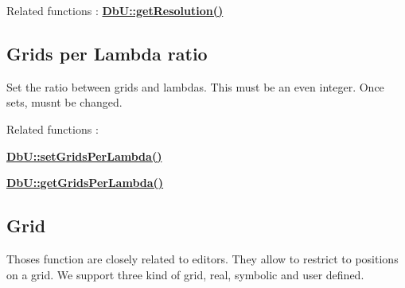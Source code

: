 Related functions \+: {\bfseries \mbox{\hyperlink{group__DbUGroup_ga120a60b09b344d01c583567a1e489d9e}{Db\+U\+::get\+Resolution()}}}\hypertarget{group__DbUGroup_secDbUGridsPerLamba}{}\subsection{Grids per Lambda ratio}\label{group__DbUGroup_secDbUGridsPerLamba}
Set the ratio between grids and lambdas. This must be an even integer. Once sets, musn\textquotesingle{}t be changed.

Related functions \+: 
\begin{DoxyItemize}
\item {\bfseries \mbox{\hyperlink{group__DbUGroup_gac93f9ba2a09105227e34bd05bcb1500c}{Db\+U\+::set\+Grids\+Per\+Lambda()}}} 
\item {\bfseries \mbox{\hyperlink{group__DbUGroup_ga9a0359adbfafc356326f5c6adf57ff04}{Db\+U\+::get\+Grids\+Per\+Lambda()}}} 
\end{DoxyItemize}\hypertarget{group__DbUGroup_secDbUGrid}{}\subsection{Grid}\label{group__DbUGroup_secDbUGrid}
Thoses function are closely related to editors. They allow to restrict to positions on a grid. We support three kind of grid, real, symbolic and user defined.


